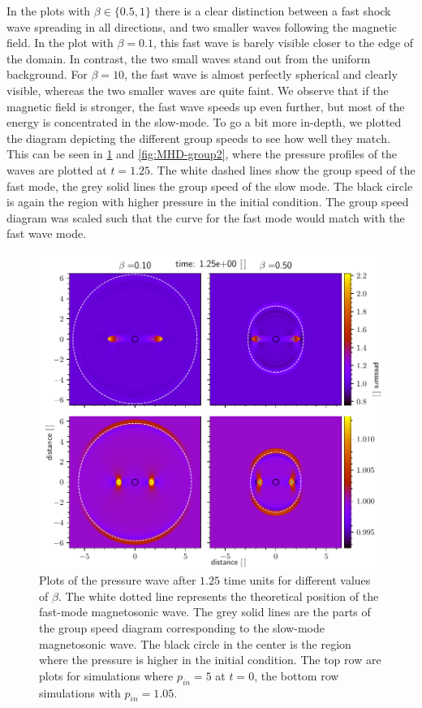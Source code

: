 In the plots with $\beta \in \{0.5,1\}$ there is a clear distinction between a fast shock wave spreading in all directions, and two smaller waves following the magnetic field.
In the plot with $\beta=0.1$, this fast wave is barely visible closer to the edge of the domain. In contrast, the two small waves stand out from the uniform background.
For $\beta=10$, the fast wave is almost perfectly spherical and clearly visible, whereas the two smaller waves are quite faint.
We observe that if the magnetic field is stronger, the fast wave speeds up even further, but most of the energy is concentrated in the slow-mode.
To go a bit more in-depth, we plotted the diagram depicting the different group speeds to see how well they match. 
This can be seen in \cref{fig:MHD-group1} and \cref{fig:MHD-group2}, where the pressure profiles of the waves are plotted at $t=1.25$.
The white dashed lines show the group speed of the fast mode, the grey solid lines the group speed of the slow mode. 
The black circle is again the region with higher pressure in the initial condition.
The group speed diagram was scaled such that the curve for the fast mode would match with the fast wave mode.

\begin{figure}[H]
	\centering
	\includegraphics[width=\linewidth]{images/group-speed-pressure1.pdf}
	\caption{Plots of the pressure wave after $1.25$ time units for different values of $\beta$. 
	The white dotted line represents the theoretical position of the fast-mode magnetosonic wave.    		The grey solid lines are the parts of the group speed diagram corresponding to the slow-mode magnetosonic wave.
	The black circle in the center is the region where the pressure is higher in the initial condition.
	The top row are plots for simulations where $p_{in}=5$ at $t=0$, the bottom row simulations with $p_{in}=1.05$.}
	\label{fig:MHD-group1}
\end{figure}

